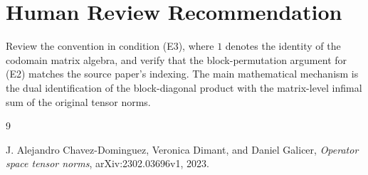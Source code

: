\documentclass[11pt]{article}
\begin{document}
\section*{Human Review Recommendation}

Review the convention in condition (E3), where \(1\) denotes the identity of
the codomain matrix algebra, and verify that the block-permutation argument for
(E2) matches the source paper's indexing.  The main mathematical mechanism is
the dual identification of the block-diagonal product with the matrix-level
infimal sum of the original tensor norms.

\begin{thebibliography}{9}

J. Alejandro Chavez-Dominguez, Veronica Dimant, and Daniel Galicer,
\emph{Operator space tensor norms}, arXiv:2302.03696v1, 2023.

\end{thebibliography}
\end{document}
